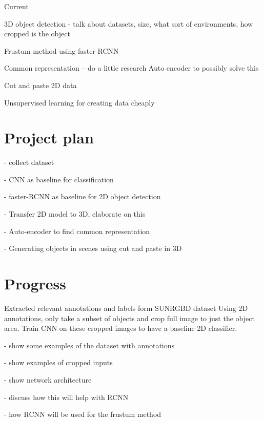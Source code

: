 \documentclass[11pt]{article}
\begin{document}
Current

3D object detection - talk about datasets, size, what sort of environments, how cropped is the object


Frustum method using faster-RCNN

Common representation -- do a little research
	Auto encoder to possibly solve this 

Cut and paste 2D data

Unsupervised learning for creating data cheaply


\section{Project plan}

- collect dataset

- CNN as baseline for classification

- faster-RCNN as baseline for 2D object detection

- Transfer 2D model to 3D, elaborate on this

- Auto-encoder to find common representation

- Generating objects in scenes using cut and paste in 3D

\section{Progress}

Extracted relevant annotations and labels form SUNRGBD dataset
Using 2D annotations, only take a subset of objects and crop full image to just the object area.
Train CNN on these cropped images to have a baseline 2D classifier.

- show some examples of the dataset with annotations

- show examples of cropped inputs

- show network architecture

- discuss how this will help with RCNN

- how RCNN will be used for the frustum method





\end{document}
